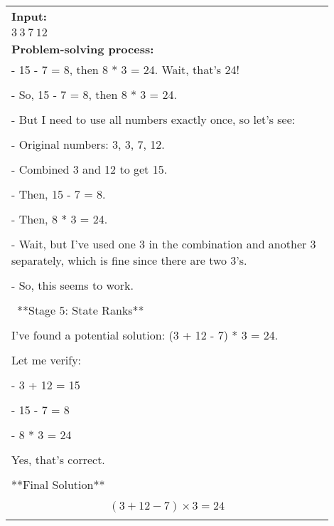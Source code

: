 \begin{table*}[ht]
\small
\centering
\caption{An example of the problem-solving process using \textsc{Self-Search (Low)} with QwQ-32B-Preview for the Game of 24 task (continued from Tab.~\ref{tab:qwq_LRM_game24_seal2}).}
\begin{tabular}{p{0.9\linewidth}} \toprule
\textbf{Input: }\\
$3\ 3\ 7\ 12$\\
\midrule
\textbf{Problem-solving process:}\\
- 15 - 7 = 8, then 8 * 3 = 24. Wait, that's 24!\\
\\
- So, 15 - 7 = 8, then 8 * 3 = 24.\\
\\
- But I need to use all numbers exactly once, so let's see:\\
\\
- Original numbers: 3, 3, 7, 12.\\
\\
- Combined 3 and 12 to get 15.\\
\\
- Then, 15 - 7 = 8.\\
\\
- Then, 8 * 3 = 24.\\
\\
- Wait, but I've used one 3 in the combination and another 3 separately, which is fine since there are two 3's.\\
\\
- So, this seems to work.\\
\\\
**Stage 5: State Ranks**\\
\\
I've found a potential solution: (3 + 12 - 7) * 3 = 24.\\
\\
Let me verify:\\
\\
- 3 + 12 = 15\\
\\
- 15 - 7 = 8\\
\\
- 8 * 3 = 24\\
\\
Yes, that's correct.\\
\\
**Final Solution**\\
\\
\[ (3 + 12 - 7) \times 3 = 24 \]\\
\\ \bottomrule
\end{tabular}
\label{tab:qwq_LRM_game24_seal3}
\end{table*}
